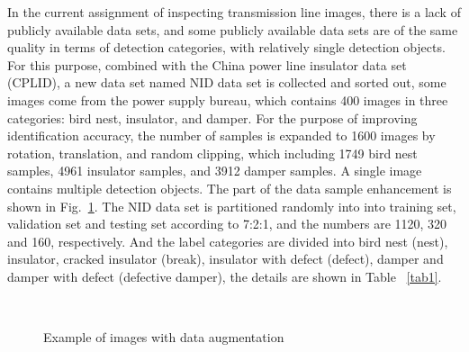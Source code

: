 \documentclass[sn-mathphys,Numbered]{sn-jnl}%
\theoremstyle{thmstyleone}%
\theoremstyle{thmstyletwo}%
\theoremstyle{thmstylethree}%
\begin{document}
In the current assignment of inspecting transmission line images, there is a lack of publicly available data sets, and some publicly available data sets are of the same quality in terms of detection categories, with relatively single detection objects. For this purpose, combined with the China power line insulator data set (CPLID)\cite{tao2018detection}, a new data set named NID data set is collected and sorted out, some images come from the power supply bureau, which contains 400 images in three categories: bird nest, insulator, and damper. For the purpose of improving identification accuracy, the number of samples is expanded to 1600 images by rotation, translation, and random clipping, which including 1749 bird nest samples, 4961 insulator samples, and 3912 damper samples. A single image contains multiple detection objects. The part of the data sample enhancement is shown in Fig.~\ref{fig7}. The NID data set is partitioned randomly into into training set, validation set and testing set according to 7:2:1, and the numbers are 1120, 320 and 160, respectively. And the label categories are divided into bird nest (nest), insulator, cracked insulator (break), insulator with defect (defect), damper and damper with defect (defective damper), the details are shown in Table ~\ref{tab1}.

\begin{figure}[htbp]
	\centering
	\\
	
	\centering
	\caption{Example of images with data augmentation}\label{fig7}
\end{figure}
\end{document}
